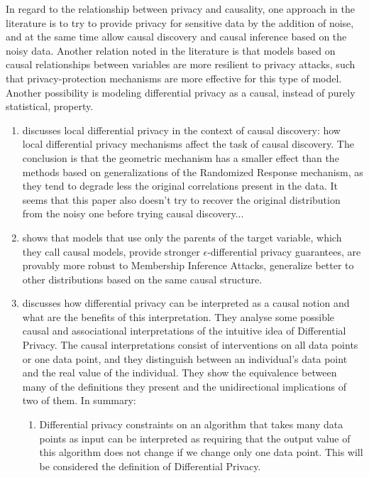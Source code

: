 In regard to the relationship between privacy and causality, one approach in the literature is to try to provide privacy for sensitive data by the addition of noise, and at the same time allow causal discovery and causal inference based on the noisy data. Another relation noted in the literature is that models based on causal relationships between variables are more resilient to privacy attacks, such that privacy-protection mechanisms are more effective for this type of model. Another possibility is modeling differential privacy as a causal, instead of purely statistical, property. 

\begin{enumerate}
\item \cite{Causal Discovery Under Local Privacy} discusses local differential privacy in the context of causal discovery: how local differential privacy mechanisms affect the task of causal discovery. The conclusion is that the geometric mechanism has a smaller effect than the methods based on generalizations of the Randomized Response mechanism, as they tend to degrade less the original correlations present in the data. It seems that this paper also doesn't try to recover the original distribution from the noisy one before trying causal discovery...
\item \cite{Alleviating Privacy Attacks via Causal Learning} shows that models that use only the parents of the target variable, which they call causal models, provide stronger $\epsilon$-differential privacy guarantees, are provably more robust to Membership Inference Attacks, generalize better to other distributions based on the same causal structure.
\item \cite{SoK: Differential Privacy as a Causal Property} discusses how differential privacy can be interpreted as a causal notion and what are the benefits of this interpretation. They analyse some possible causal and associational interpretations of the intuitive idea of Differential Privacy. The causal interpretations consist of interventions on all data points or one data point, and they distinguish between an individual's data point and the real value of the individual. They show the equivalence between many of the definitions they present and the unidirectional implications of two of them. In summary: \begin{enumerate}
    \item Differential privacy constraints on an algorithm that takes many data points as input can be interpreted as requiring that the output value of this algorithm does not change if we change only one data point. This will be considered the definition of Differential Privacy.

\end{enumerate}
\end{enumerate}
